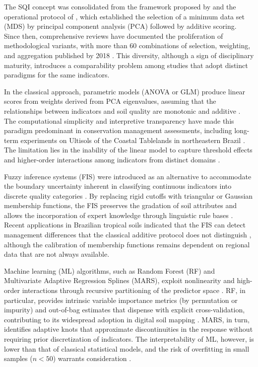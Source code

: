 \documentclass[pdflatex,sn-basic]{sn-jnl}%
\begin{document}
The SQI concept was consolidated from the framework proposed by \cite{Karlen1997} and the operational protocol of \cite{Andrews2002}, which established the selection of a minimum data set (MDS) by principal component analysis (PCA) followed by additive scoring. Since then, comprehensive reviews have documented the proliferation of methodological variants, with more than 60 combinations of selection, weighting, and aggregation published by 2018 \citep{Bunemann2018}. This diversity, although a sign of disciplinary maturity, introduces a comparability problem among studies that adopt distinct paradigms for the same indicators.

In the classical approach, parametric models (ANOVA or GLM) produce linear scores from weights derived from PCA eigenvalues, assuming that the relationships between indicators and soil quality are monotonic and additive \citep{Mukherjee2014}. The computational simplicity and interpretive transparency have made this paradigm predominant in conservation management assessments, including long-term experiments on Ultisols of the Coastal Tablelands in northeastern Brazil \citep{Assuncao2023}. The limitation lies in the inability of the linear model to capture threshold effects and higher-order interactions among indicators from distinct domains \citep{DosSantos2021}.

Fuzzy inference systems (FIS) were introduced as an alternative to accommodate the boundary uncertainty inherent in classifying continuous indicators into discrete quality categories \citep{Torbert2008}. By replacing rigid cutoffs with triangular or Gaussian membership functions, the FIS preserves the gradation of soil attributes and allows the incorporation of expert knowledge through linguistic rule bases \citep{Nabiollahi2018}. Recent applications in Brazilian tropical soils indicated that the FIS can detect management differences that the classical additive protocol does not distinguish \citep{DosSantos2021}, although the calibration of membership functions remains dependent on regional data that are not always available.

Machine learning (ML) algorithms, such as Random Forest (RF) and Multivariate Adaptive Regression Splines (MARS), exploit nonlinearity and high-order interactions through recursive partitioning of the predictor space \citep{Zeraatpisheh2020}. RF, in particular, provides intrinsic variable importance metrics (by permutation or impurity) and out-of-bag estimates that dispense with explicit cross-validation, contributing to its widespread adoption in digital soil mapping \citep{Wadoux2020}. MARS, in turn, identifies adaptive knots that approximate discontinuities in the response without requiring prior discretization of indicators. The interpretability of ML, however, is lower than that of classical statistical models, and the risk of overfitting in small samples ($n < 50$) warrants consideration \citep{Wadoux2020}.
\end{document}
